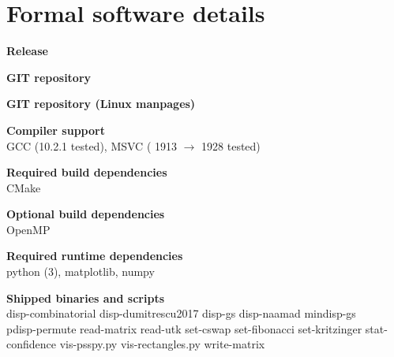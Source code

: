 \section*{Formal software details}
  \textbf{Release}\\
  \dptkversion
  
  \textbf{GIT repository}\\
  
  \textbf{GIT repository (Linux manpages)}\\
  
  \textbf{Compiler support}\\
  GCC (10.2.1 tested), MSVC ( 1913 $\rightarrow$ 1928 tested)

  \textbf{Required build dependencies}\\
  CMake
    
  \textbf{Optional build dependencies}\\
  OpenMP
  
  \textbf{Required runtime dependencies}\\
  python (3), matplotlib, numpy
  
  \textbf{Shipped binaries and scripts}\\
  disp-combinatorial
disp-dumitrescu2017
disp-gs
disp-naamad
mindisp-gs\\
pdisp-permute
read-matrix
read-utk
set-cswap
set-fibonacci
set-kritzinger
stat-confidence
vis-psspy.py
vis-rectangles.py
write-matrix
\clearpage
